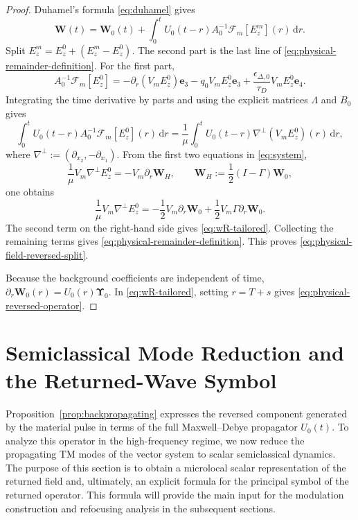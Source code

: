 \documentclass[11pt,reqno]{amsart}
\newcommand{\dd}{\,\mathrm{d}}
\numberwithin{equation}{section}
\begin{document}
\begin{proof} 
Duhamel's formula \eqref{eq:duhamel} gives
$$
\bm{W}(t)=\bm{W}_0(t)+\int_0^tU_0(t-r)A_0^{-1} \bm{\mathcal F}_m[E_z^m](r)\dd r.
$$
Split $E_z^m=E_z^0+(E_z^m-E_z^0)$. The second part is the last line of \eqref{eq:physical-remainder-definition}. For the first part,
$$
A_0^{-1}\bm{\mathcal F}_m[E_z^0] =-\partial_r(V_mE_z^0)\bm{e}_3-q_0V_mE_z^0\bm{e}_3 +\frac{\epsilon_{\Delta,0}}{\tau_D}V_mE_z^0\bm{e}_4.
$$
Integrating the time derivative by parts and using the explicit matrices $\Lambda$ and $B_0$ gives
$$
\int_0^tU_0(t-r)A_0^{-1}\bm{\mathcal F}_m[E_z^0](r)\dd r = \frac1\mu\int_0^tU_0(t-r)\nabla^\perp(V_mE_z^0)(r)\dd r,
$$
where $\nabla^\perp:=(\partial_{x_2}, -\partial_{x_1})$. From the first two equations in \eqref{eq:system}, 
$$
\frac1\mu V_m\nabla^\perp E_z^0=-V_m\partial_r\bm{W}_H, \qquad \bm{W}_H:=\frac12(I-\Gamma)\bm{W}_0,
$$
one obtains
$$
\frac1\mu V_m\nabla^\perp E_z^0=-\frac12V_m\partial_r\bm{W}_0+\frac12V_m\Gamma\partial_r\bm{W}_0.
$$
The second term on the right-hand side gives \eqref{eq:wR-tailored}. Collecting the remaining terms gives \eqref{eq:physical-remainder-definition}. This proves \eqref{eq:physical-field-reversed-split}.

Because the background coefficients are independent of time, $\partial_r\bm{W}_0(r)=U_0(r)\bm{\Upsilon}_0$. In \eqref{eq:wR-tailored}, setting $r=T+s$ gives \eqref{eq:physical-reversed-operator}. 
\end{proof}

\section{Semiclassical Mode Reduction and the Returned-Wave Symbol}\label{sec:semiclassical}

Proposition~\ref{prop:backpropagating} expresses the reversed component generated by the material pulse in terms of the full Maxwell--Debye propagator $U_0(t)$. To analyze this operator in the high-frequency regime, we now reduce the propagating TM modes of the vector system to scalar semiclassical dynamics. The purpose of this section is to obtain a microlocal scalar representation of the returned field and, ultimately, an explicit formula for the principal symbol of the returned operator. This formula will provide the main input for the modulation construction and refocusing analysis in the subsequent sections.
\end{document}
